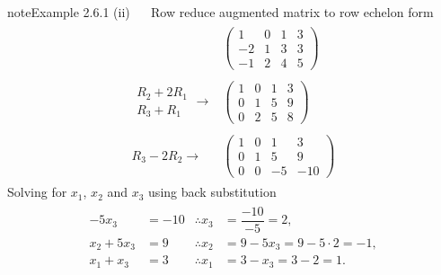 \documentclass[letterpaper,10pt,english]{jupyterBook}
\begin{document}
\begin{sphinxadmonition}{note}{Example 2.6.1}
\sphinxAtStartPar
(ii)   Row reduce augmented matrix to row echelon form
\begin{equation*}
\begin{split} \begin{align*}
    & \left( \begin{array}{ccc|c}
        1 & 0 & 1 & 3 \\
        -2 & 1 & 3 & 3 \\
        -1 & 2 & 4 & 5
    \end{array} \right)
     \\ \\
    \begin{array}{l} R_2 + 2R_1 \\ R_3 + R_1 \end{array} \longrightarrow &
    \left( \begin{array}{ccc|c}
        1 & 0 & 1 & 3 \\
        0 & 1 & 5 & 9 \\
        0 & 2 & 5 & 8
    \end{array} \right)
    \\ \\
     R_3 - 2R_2  \longrightarrow &
    \left( \begin{array}{ccc|c}
        1 & 0 & 1 & 3 \\
        0 & 1 & 5 & 9 \\
        0 & 0 & -5 & -10
    \end{array} \right)
\end{align*} \end{split}
\end{equation*}
\sphinxAtStartPar
Solving for \(x_1\), \(x_2\) and \(x_3\) using back substitution
\begin{equation*}
\begin{split} \begin{align*}
    -5x_3 &= -10 & \therefore x_3 &= \dfrac{-10}{-5} = 2, \\
    x_2 + 5x_3 &= 9 & \therefore x_2 &= 9 - 5x_3 = 9 - 5 \cdot 2 = -1, \\
    x_1 + x_3 &= 3 & \therefore x_1 &= 3 - x_3 = 3 - 2 = 1.
\end{align*} \end{split}
\end{equation*}\end{sphinxadmonition}

\sphinxstepscope

\ignorespaces 
\end{document}
